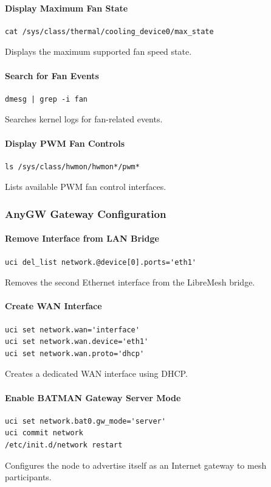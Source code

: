 \documentclass[conference]{IEEEtran}
\begin{document}
\paragraph{Display Maximum Fan State}
\begin{verbatim}
cat /sys/class/thermal/cooling_device0/max_state
\end{verbatim}
Displays the maximum supported fan speed state.

\paragraph{Search for Fan Events}
\begin{verbatim}
dmesg | grep -i fan
\end{verbatim}
Searches kernel logs for fan-related events.

\paragraph{Display PWM Fan Controls}
\begin{verbatim}
ls /sys/class/hwmon/hwmon*/pwm*
\end{verbatim}
Lists available PWM fan control interfaces.

\subsubsection{AnyGW Gateway Configuration}

\paragraph{Remove Interface from LAN Bridge}
\begin{verbatim}
uci del_list network.@device[0].ports='eth1'
\end{verbatim}
Removes the second Ethernet interface from the LibreMesh bridge.

\paragraph{Create WAN Interface}
\begin{verbatim}
uci set network.wan='interface'
uci set network.wan.device='eth1'
uci set network.wan.proto='dhcp'
\end{verbatim}
Creates a dedicated WAN interface using DHCP.

\paragraph{Enable BATMAN Gateway Server Mode}
\begin{verbatim}
uci set network.bat0.gw_mode='server'
uci commit network
/etc/init.d/network restart
\end{verbatim}
Configures the node to advertise itself as an Internet gateway to mesh participants.
\end{document}

